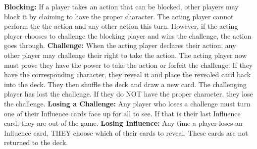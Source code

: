 \documentclass[11.5pt]{article}
\begin{document}
\noindent \textbf{Blocking:} If a player takes an action that can be blocked, other players may block it by claiming to have the proper character. The acting player cannot perform the the action and any other action this turn. However, if the acting player chooses to challenge the blocking player and wins the challenge, the action goes through.
\vskip 0.12cm
\noindent \textbf{Challenge:}  When the acting player declares their action, any other player may challenge their right to
take the action. The acting player now must prove they have the power to take the action or forfeit the challenge. If they have the corresponding character, they reveal it and place the revealed card back into the deck. They then shuffle the deck and draw a new card. The challenging player has lost the challenge. If they do NOT have the proper character, they lose the challenge.
\vskip 0.12cm
\noindent \textbf{Losing a Challenge:} Any player who loses a challenge must turn one of their Influence cards face up
for all to see. If that is their last Influence card, they are out of the game. 
\vskip 0.12cm
\noindent \textbf{Losing Influence:} Any time a player loses an Influence card, THEY choose which of their cards to reveal. These cards are not returned to the deck. 
\end{document}
